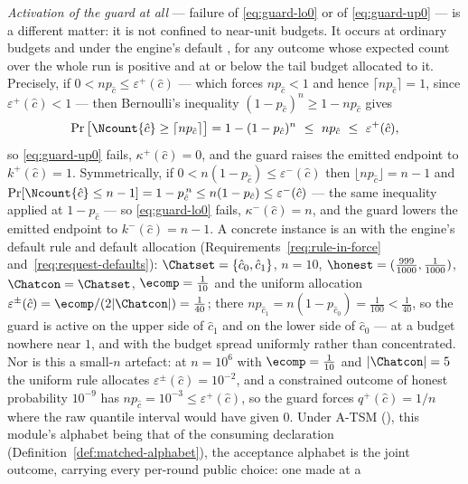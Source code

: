 \begin{remark}
\emph{Activation of the guard at all} --- failure of \eqref{eq:guard-lo0} or
of \eqref{eq:guard-up0} --- is a different matter: it is not confined to
near-unit budgets. It occurs at ordinary budgets and under the engine's
default , for any outcome whose expected count over
the whole run is positive and at or below the tail budget allocated to it.
Precisely, if $0<np_{\hat c}\le\varepsilon^{+}(\hat c)$ --- which forces
$np_{\hat c}<1$ and hence $\lceil np_{\hat c}\rceil=1$, since
$\varepsilon^{+}(\hat c)<1$ --- then Bernoulli's inequality
$(1-p_{\hat c})^{n}\ge1-np_{\hat c}$ gives
\begin{equation*}
  \Pr\big[\Ncount{\hat c}\ge\lceil np_{\hat c}\rceil\big]
  =1-(1-p_{\hat c})^{n}\ \le\ np_{\hat c}\ \le\ \varepsilon^{+}(\hat c),
\end{equation*}
so \eqref{eq:guard-up0} fails, $\kappa^{+}(\hat c)=0$, and the guard raises
the emitted endpoint to $k^{+}(\hat c)=1$. Symmetrically, if
$0<n(1-p_{\hat c})\le\varepsilon^{-}(\hat c)$ then $\lfloor
np_{\hat c}\rfloor=n-1$ and $\Pr[\Ncount{\hat c}\le n-1]=1-p_{\hat c}^{\,n}\le
n(1-p_{\hat c})\le\varepsilon^{-}(\hat c)$ --- the same inequality applied at
$1-p_{\hat c}$ --- so \eqref{eq:guard-lo0} fails, $\kappa^{-}(\hat c)=n$, and
the guard lowers the emitted endpoint to $k^{-}(\hat c)=n-1$. A concrete
instance is an  with the engine's default rule and
default allocation (Requirements~\ref{req:rule-in-force}
and~\ref{req:request-defaults}): $\Chatset=\{\hat c_0,\hat c_1\}$, $n=10$,
$\honest=(\tfrac{999}{1000},\tfrac1{1000})$, $\Chatcon=\Chatset$,
$\ecomp=\tfrac1{10}$ and the uniform allocation
$\varepsilon^{\pm}(\hat c)=\ecomp/(2|\Chatcon|)=\tfrac1{40}$; there
$np_{\hat c_1}=n(1-p_{\hat c_0})=\tfrac1{100}<\tfrac1{40}$, so the guard is
active on the upper side of $\hat c_1$ and on the lower side of $\hat c_0$
--- at a budget nowhere near $1$, and with the budget spread uniformly rather
than concentrated. Nor is this a small-$n$ artefact: at $n=10^{6}$ with
$\ecomp=\tfrac1{10}$ and $|\Chatcon|=5$ the uniform rule allocates
$\varepsilon^{\pm}(\hat c)=10^{-2}$, and a constrained outcome of honest
probability $10^{-9}$ has $np_{\hat c}=10^{-3}\le\varepsilon^{+}(\hat c)$, so
the guard forces $q^{+}(\hat c)=1/n$ where the raw quantile interval would
have given $0$. Under A-TSM (), this
module's alphabet being that of the consuming declaration
(Definition~\ref{def:matched-alphabet}), the acceptance alphabet is the
joint outcome, carrying every per-round public choice: one made at a

\end{remark}
